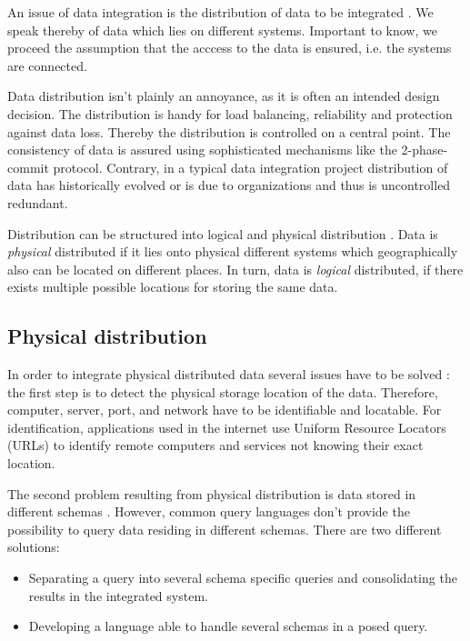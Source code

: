 An issue of data integration is the distribution of data to be integrated \cite[p. 51]{DBLP:books/dp/LeserN2006}. We speak thereby of data which lies on different systems. 
Important to know, we proceed the assumption that the acccess to the data is ensured, i.e. the systems are connected.

Data distribution isn't plainly an annoyance, as it is often an intended design decision\cite[p. 54]{DBLP:books/dp/LeserN2006}. The distribution is handy for load balancing, reliability and protection against data loss. Thereby the distribution is controlled on a central point. 
The consistency of data is assured using sophisticated mechanisms like the 2-phase-commit protocol\cite[p. 54]{DBLP:books/dp/LeserN2006}. Contrary, in a typical data integration project distribution of data has historically evolved or is due to organizations and thus is uncontrolled redundant.

Distribution can be structured into logical and physical distribution \cite[p. 51]{DBLP:books/dp/LeserN2006}. Data is \textit{physical} distributed if it lies onto physical different systems
which geographically also can be located on different places. In turn, data is \textit{logical} distributed, if there exists multiple possible locations for storing the same data. 

\subsection{Physical distribution}
In order to integrate physical distributed data several issues have to be solved \cite[p. 51]{DBLP:books/dp/LeserN2006}: the first step is to detect the physical storage location of the data. Therefore, computer, server, port, and network have to be identifiable and locatable. For identification, applications used in the internet use Uniform Resource Locators (URLs) to identify remote computers and services not knowing their exact location.

The second problem resulting from physical distribution is data stored in different schemas \cite[p. 52]{DBLP:books/dp/LeserN2006}. However, common query languages don't provide the possibility to query data residing in different schemas. There are two different solutions:
\begin{itemize}
\item Separating a query into several schema specific queries and consolidating the results in the integrated system.
\item Developing a language able to handle several schemas in a posed query.
\end{itemize}

